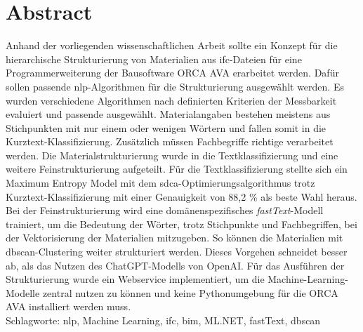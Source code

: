 \chapter*{Abstract}
Anhand der vorliegenden wissenschaftlichen Arbeit sollte ein Konzept für die hierarchische Strukturierung von Materialien aus \acf{ifc}-Dateien für eine Programmerweiterung der Bausoftware ORCA AVA erarbeitet werden. Dafür sollen passende \acf{nlp}-Algorithmen für die Strukturierung ausgewählt werden. Es wurden verschiedene Algorithmen nach definierten Kriterien der Messbarkeit evaluiert und passende ausgewählt. Materialangaben bestehen meistens aus Stichpunkten mit nur einem oder wenigen Wörtern und fallen somit in die Kurztext-Klassifizierung. Zusätzlich müssen Fachbegriffe richtige verarbeitet werden. Die Materialstrukturierung wurde in die Textklassifizierung und eine weitere Feinstrukturierung aufgeteilt. Für die Textklassifizierung stellte sich ein Maximum Entropy Model mit dem \ac{sdca}-Optimierungsalgorithmus trotz Kurztext-Klassifizierung mit einer Genauigkeit von 88,2 \% als beste Wahl heraus. Bei der Feinstrukturierung wird eine domänenspezifisches \textit{fastText}-Modell trainiert, um die Bedeutung der Wörter, trotz Stichpunkte und Fachbegriffen, bei der Vektorisierung der Materialien mitzugeben. So können die Materialien mit \acf{dbscan}-Clustering weiter strukturiert werden. Dieses Vorgehen schneidet besser ab, als das Nutzen des ChatGPT-Modells von OpenAI. Für das Ausführen der Strukturierung wurde ein Webservice implementiert, um die Machine-Learning-Modelle zentral nutzen zu können und keine Pythonumgebung für die ORCA AVA installiert werden muss.\\

\noindent Schlagworte: \acs{nlp}, Machine Learning, \acs{ifc}, \acs{bim}, ML.NET, fastText, \acs{dbscan}

